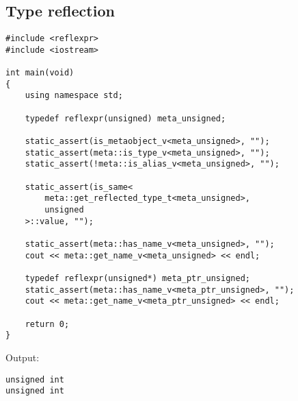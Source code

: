 \subsection{Type reflection}

\begin{verbatim}
#include <reflexpr>
#include <iostream>

int main(void)
{
	using namespace std;

	typedef reflexpr(unsigned) meta_unsigned;

	static_assert(is_metaobject_v<meta_unsigned>, "");
	static_assert(meta::is_type_v<meta_unsigned>, "");
	static_assert(!meta::is_alias_v<meta_unsigned>, "");

	static_assert(is_same<
		meta::get_reflected_type_t<meta_unsigned>,
		unsigned
	>::value, "");

	static_assert(meta::has_name_v<meta_unsigned>, "");
	cout << meta::get_name_v<meta_unsigned> << endl;

	typedef reflexpr(unsigned*) meta_ptr_unsigned;
	static_assert(meta::has_name_v<meta_ptr_unsigned>, "");
	cout << meta::get_name_v<meta_ptr_unsigned> << endl;

	return 0;
}
\end{verbatim}

Output:

\begin{verbatim}
unsigned int
unsigned int
\end{verbatim}

